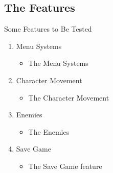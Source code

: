 

\subsection{The Features}

\centerline{Some Features to Be Tested}

\begin{enumerate}
   \item Menu Systems
   \begin{itemize}
     \item The Menu Systems 
   \end{itemize}
  
  \item Character Movement
   \begin{itemize}
     \item The Character Movement

   \end{itemize}

     \item Enemies 
   \begin{itemize}
     \item The Enemies
   \end{itemize}



 \item Save Game
   \begin{itemize}
 	\item 
 	The Save Game feature 
 	 \end{itemize}
 	 \end{enumerate}
